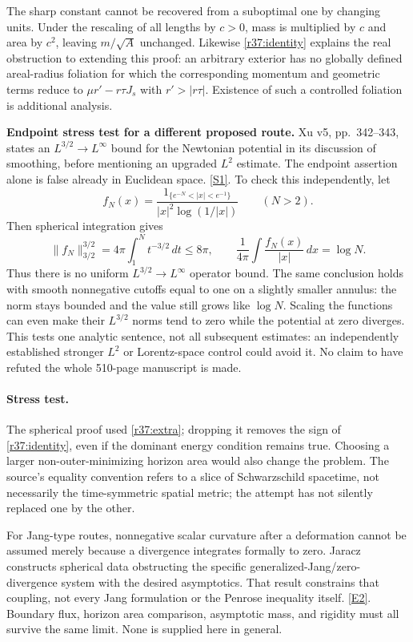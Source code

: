 \documentclass[11pt,a4paper]{article}
\newcommand{\sref}[2]{\hyperlink{source:#1:#2}{[S#2]}}
\newcommand{\eref}[2]{\hyperlink{extra:#1:#2}{[E#2]}}
\numberwithin{equation}{section}
\begin{document}
The sharp constant cannot be recovered from a suboptimal one by changing
units. Under the rescaling of all lengths by $c>0$, mass is multiplied by $c$
and area by $c^2$, leaving $m/\sqrt A$ unchanged. Likewise \eqref{r37:identity}
explains the real obstruction to extending this proof: an arbitrary exterior
has no globally defined areal-radius foliation for which the corresponding
momentum and geometric terms reduce to $\mu r'-r\tau J_s$ with
$r'>|r\tau|$. Existence of such a controlled foliation is additional analysis.

\textbf{Endpoint stress test for a different proposed route.}
Xu v5, pp.~342--343, states an $L^{3/2}\to L^\infty$ bound for the Newtonian
potential in its discussion of smoothing, before mentioning an upgraded
$L^2$ estimate. The endpoint assertion alone is false already in Euclidean
space. \sref{37}{1}. To check this independently, let
\[
 f_N(x)=\frac{1_{\{e^{-N}<|x|<e^{-1}\}}}
 {|x|^2\log(1/|x|)}\qquad(N>2).
\]
Then spherical integration gives
\[
 \|f_N\|_{3/2}^{3/2}=4\pi\int_1^N t^{-3/2}\,dt\le8\pi,
 \qquad \frac1{4\pi}\int\frac{f_N(x)}{|x|}\,dx=\log N.
\]
Thus there is no uniform $L^{3/2}\to L^\infty$ operator bound. The same
conclusion holds with smooth nonnegative cutoffs equal to one on a slightly
smaller annulus: the norm stays bounded and the value still grows like
$\log N$. Scaling the functions can even make their $L^{3/2}$ norms tend to
zero while the potential at zero diverges. This tests one analytic sentence,
not all subsequent estimates: an independently established stronger $L^2$
or Lorentz-space control could avoid it. No claim to have refuted the whole
510-page manuscript is made.

\paragraph{Stress test.}
The spherical proof used \eqref{r37:extra}; dropping it removes the sign of
\eqref{r37:identity}, even if the dominant energy condition remains true.
Choosing a larger non-outer-minimizing horizon area would also change the
problem. The source's equality convention refers to a slice of Schwarzschild
spacetime, not necessarily the time-symmetric spatial metric; the attempt
has not silently replaced one by the other.

For Jang-type routes, nonnegative scalar curvature after a deformation cannot
be assumed merely because a divergence integrates formally to zero. Jaracz
constructs spherical data obstructing the specific generalized-Jang/zero-
divergence system with the desired asymptotics. That result constrains that
coupling, not every Jang formulation or the Penrose inequality itself.
\eref{37}{2}. Boundary flux, horizon area comparison, asymptotic mass, and
rigidity must all survive the same limit. None is supplied here in general.
\end{document}
